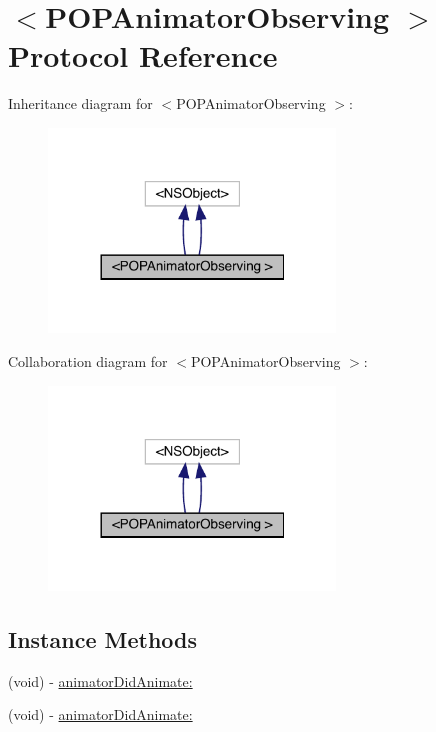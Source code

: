 \hypertarget{protocol_p_o_p_animator_observing_01-p}{}\section{$<$P\+O\+P\+Animator\+Observing $>$ Protocol Reference}
\label{protocol_p_o_p_animator_observing_01-p}


Inheritance diagram for $<$P\+O\+P\+Animator\+Observing $>$\+:\nopagebreak
\begin{figure}[H]
\begin{center}
\leavevmode
\includegraphics[width=216pt]{protocol_p_o_p_animator_observing_01-p__inherit__graph}
\end{center}
\end{figure}


Collaboration diagram for $<$P\+O\+P\+Animator\+Observing $>$\+:\nopagebreak
\begin{figure}[H]
\begin{center}
\leavevmode
\includegraphics[width=216pt]{protocol_p_o_p_animator_observing_01-p__coll__graph}
\end{center}
\end{figure}
\subsection*{Instance Methods}
\begin{DoxyCompactItemize}
\item 
(void) -\/ \mbox{\hyperlink{protocol_p_o_p_animator_observing_01-p_abd80662e73b3b9f9309a91d21b27aae0}{animator\+Did\+Animate\+:}}
\item 
(void) -\/ \mbox{\hyperlink{protocol_p_o_p_animator_observing_01-p_abd80662e73b3b9f9309a91d21b27aae0}{animator\+Did\+Animate\+:}}
\end{DoxyCompactItemize}


